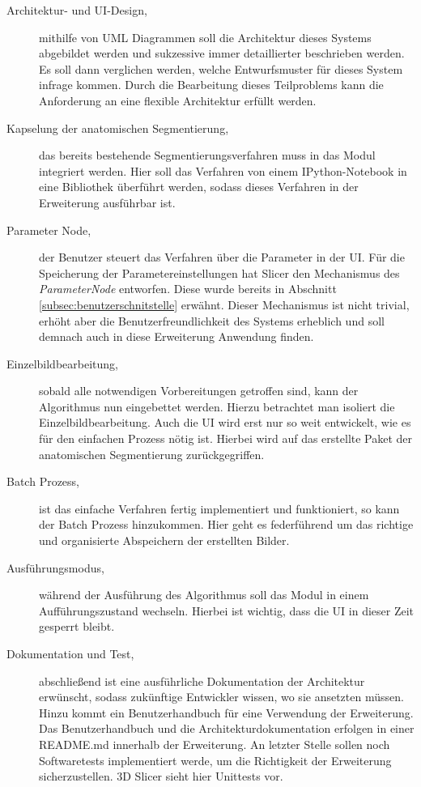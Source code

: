 \begin{description}
	\item[Architektur- und \ac{UI}-Design,] mithilfe von UML Diagrammen soll die Architektur
		dieses Systems abgebildet werden und sukzessive immer detaillierter beschrieben
		werden. Es soll dann verglichen werden, welche Entwurfsmuster für dieses System
		infrage kommen. Durch die Bearbeitung dieses Teilproblems kann die
		Anforderung an eine flexible Architektur erfüllt werden.

	\item[Kapselung der anatomischen Segmentierung,] das bereits bestehende Segmentierungsverfahren
		muss in das Modul integriert werden. Hier soll das Verfahren von einem
		IPython-Notebook in eine Bibliothek überführt werden, sodass dieses Verfahren
		in der Erweiterung ausführbar ist.

	\item[Parameter Node,] der Benutzer steuert das Verfahren über die Parameter in
		der \ac{UI}. Für die Speicherung der Parametereinstellungen hat Slicer den Mechanismus
		des \textit{ParameterNode} entworfen. Diese wurde bereits in Abschnitt \ref{subsec:benutzerschnitstelle}
		erwähnt. Dieser Mechanismus ist nicht trivial, erhöht aber die Benutzerfreundlichkeit
		des Systems erheblich und soll demnach auch in diese Erweiterung Anwendung finden.

	\item[Einzelbildbearbeitung,] sobald alle notwendigen Vorbereitungen getroffen
		sind, kann der Algorithmus nun eingebettet werden. Hierzu betrachtet man isoliert
		die Einzelbildbearbeitung. Auch die \ac{UI} wird erst nur so weit entwickelt,
		wie es für den einfachen Prozess nötig ist. Hierbei wird auf das erstellte Paket
		der anatomischen Segmentierung zurückgegriffen.

	\item[Batch Prozess,] ist das einfache Verfahren fertig implementiert und funktioniert,
		so kann der Batch Prozess hinzukommen. Hier geht es federführend um das richtige
		und organisierte Abspeichern der erstellten Bilder.

	\item[Ausführungsmodus,] während der Ausführung des Algorithmus soll das Modul
		in einem Aufführungszustand wechseln. Hierbei ist wichtig, dass die \ac{UI}
		in dieser Zeit gesperrt bleibt.

	\item[Dokumentation und Test,] abschließend ist eine ausführliche Dokumentation
		der Architektur erwünscht, sodass zukünftige Entwickler wissen, wo sie ansetzten
		müssen. Hinzu kommt ein Benutzerhandbuch für eine Verwendung der Erweiterung.
		Das Benutzerhandbuch und die Architekturdokumentation erfolgen in einer README.md
		innerhalb der Erweiterung. An letzter Stelle sollen noch Softwaretests
		implementiert werde, um die Richtigkeit der Erweiterung sicherzustellen. 3D
		Slicer sieht hier Unittests vor.
\end{description}

